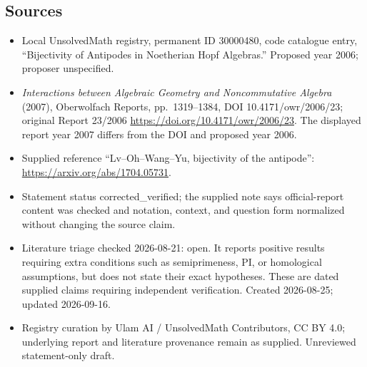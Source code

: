 \documentclass[11pt]{article}
\begin{document}
\subsection{Sources}
\begin{itemize}
\item Local UnsolvedMath registry, permanent ID 30000480, code catalogue entry, ``Bijectivity of Antipodes in Noetherian Hopf Algebras.'' Proposed year 2006; proposer unspecified.
\item \emph{Interactions between Algebraic Geometry and Noncommutative Algebra} (2007), Oberwolfach Reports, pp.\ 1319--1384, DOI 10.4171/owr/2006/23; original Report 23/2006 \url{https://doi.org/10.4171/owr/2006/23}. The displayed report year 2007 differs from the DOI and proposed year 2006.
\item Supplied reference ``Lv--Oh--Wang--Yu, bijectivity of the antipode'': \url{https://arxiv.org/abs/1704.05731}.
\item Statement status corrected\_verified; the supplied note says official-report content was checked and notation, context, and question form normalized without changing the source claim.
\item Literature triage checked 2026-08-21: open. It reports positive results requiring extra conditions such as semiprimeness, PI, or homological assumptions, but does not state their exact hypotheses. These are dated supplied claims requiring independent verification. Created 2026-08-25; updated 2026-09-16.
\item Registry curation by Ulam AI / UnsolvedMath Contributors, CC BY 4.0; underlying report and literature provenance remain as supplied. Unreviewed statement-only draft.
\end{itemize}
\end{document}

